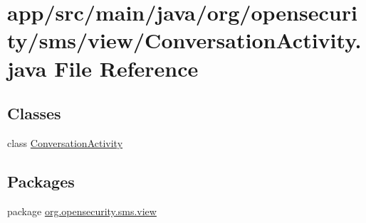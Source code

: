 \hypertarget{a00030}{\section{app/src/main/java/org/opensecurity/sms/view/\+Conversation\+Activity.java File Reference}
\label{a00030}
}
\subsection*{Classes}
\begin{DoxyCompactItemize}
\item 
class \hyperlink{a00006}{Conversation\+Activity}
\end{DoxyCompactItemize}
\subsection*{Packages}
\begin{DoxyCompactItemize}
\item 
package \hyperlink{a00041}{org.\+opensecurity.\+sms.\+view}
\end{DoxyCompactItemize}

